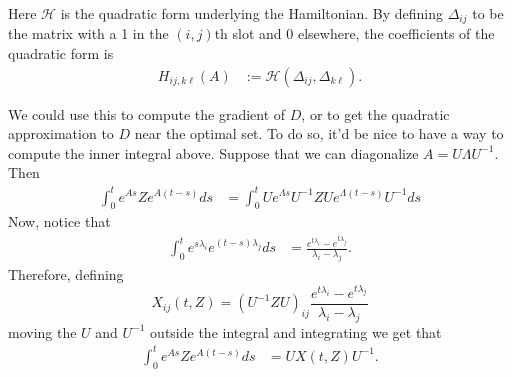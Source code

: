 \documentclass{article}
\newcommand{\calH}{\mathcal{H}}
\newcommand{\1}{\mathbbm{1}}
\begin{document}
Here $\calH$ is the quadratic form underlying the Hamiltonian.
By defining $\Delta_{ij}$ to be the matrix with a 1 in the $(i,j)$th slot
and 0 elsewhere,
the coefficients of the quadratic form is
\begin{equation}
    \begin{aligned}
        H_{ij, k\ell}(A)
        &:=
        \calH(\Delta_{ij}, \Delta_{k\ell}) .
    \end{aligned}
\end{equation}

We could use this to compute the gradient of $D$,
or to get the quadratic approximation to $D$ near the optimal set.
To do so, it'd be nice to have a way to compute the inner integral above.
Suppose that we can diagonalize $A = U \Lambda U^{-1}$.
Then
\begin{equation} \label{eqn:exp_deriv}
  \begin{aligned}
      \int_0^t e^{As} Z e^{A(t-s)} ds 
      &=
      \int_0^t U e^{\Lambda s} U^{-1} Z U e^{\Lambda (t-s)} U^{-1} ds 
  \end{aligned}
\end{equation}
Now, notice that
\begin{equation}
  \begin{aligned}
      \int_0^t e^{s \lambda_i} e^{(t-s) \lambda_j} ds
      &=
      \frac{ e^{t \lambda_i} - e^{t \lambda_j} }{ \lambda_i - \lambda_j } .
  \end{aligned}
\end{equation}
Therefore, 
defining
\begin{equation}
    X_{ij}(t,Z) = \left( U^{-1} Z U \right)_{ij}
      \frac{ e^{t \lambda_i} - e^{t \lambda_j} }{ \lambda_i - \lambda_j } 
\end{equation}
moving the $U$ and $U^{-1}$ outside the integral and integrating we get that
\begin{equation}
  \begin{aligned}
      \int_0^t e^{As} Z e^{A(t-s)} ds 
      &=
      U X(t,Z) U^{-1} .
  \end{aligned}
\end{equation}
\end{document}
